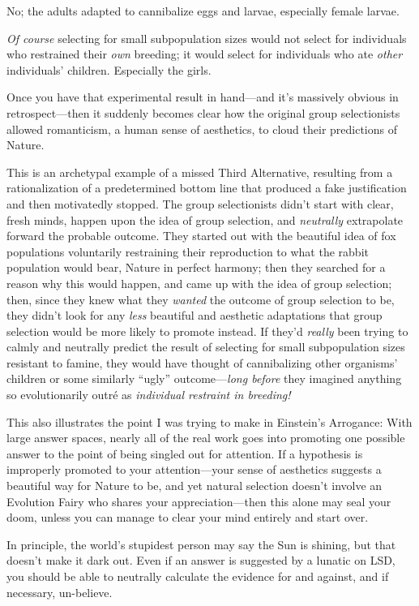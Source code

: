 {{
 No; the adults adapted to cannibalize eggs and larvae, especially
female larvae.}

{
 \textit{Of course} selecting for small subpopulation sizes would
not select for individuals who restrained their \textit{own} breeding;
it would select for individuals who ate \textit{other}
individuals' children. Especially the girls.}

{
 Once you have that experimental result in hand---and
it's massively obvious in retrospect---then it suddenly
becomes clear how the original group selectionists allowed romanticism,
a human sense of aesthetics, to cloud their predictions of Nature.}

{
 This is an archetypal example of a missed Third Alternative,
resulting from a rationalization of a predetermined bottom line that
produced a fake justification and then motivatedly stopped. The group
selectionists didn't start with clear, fresh minds,
happen upon the idea of group selection, and \textit{neutrally}
extrapolate forward the probable outcome. They started out with the
beautiful idea of fox populations voluntarily restraining their
reproduction to what the rabbit population would bear, Nature in
perfect harmony; then they searched for a reason why this would happen,
and came up with the idea of group selection; then, since they knew
what they \textit{wanted} the outcome of group selection to be, they
didn't look for any \textit{less} beautiful and
aesthetic adaptations that group selection would be more likely to
promote instead. If they'd \textit{really} been trying
to calmly and neutrally predict the result of selecting for small
subpopulation sizes resistant to famine, they would have thought of
cannibalizing other organisms' children or some
similarly ``ugly''
outcome---\textit{long before} they imagined anything so evolutionarily
outré as \textit{individual restraint in breeding!}}

{
 This also illustrates the point I was trying to make in
Einstein's Arrogance: With large answer spaces, nearly
all of the real work goes into promoting one possible answer to the
point of being singled out for attention. If a hypothesis is improperly
promoted to your attention---your sense of aesthetics suggests a
beautiful way for Nature to be, and yet natural selection
doesn't involve an Evolution Fairy who shares your
appreciation---then this alone may seal your doom, unless you can
manage to clear your mind entirely and start over.}

{
 In principle, the world's stupidest person may say
the Sun is shining, but that doesn't make it dark out.
Even if an answer is suggested by a lunatic on LSD, you should be able
to neutrally calculate the evidence for and against, and if necessary,
un-believe.}

}

